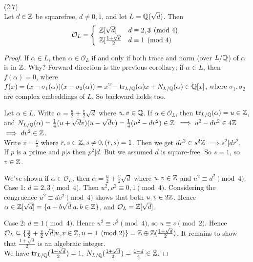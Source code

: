 \documentclass[a4paper]{article}
\begin{document}
\begin{prop} (2.7)\\
Let $d \in \mathbb{Z}$ be squarefree, $d \neq 0,1$, and let $L = \mathbb{Q}(\sqrt{d})$. Then 
\begin{equation*}
\begin{aligned}
\mathcal{O}_L = \left\{\begin{array}{ll}
\mathbb{Z}[\sqrt{d}] & d \equiv 2,3 \pmod 4\\
\mathbb{Z}[\frac{1+\sqrt{d}}{2} & d \equiv 1 \pmod 4
\end{array}
\right.
\end{aligned}
\end{equation*}
\begin{proof}
If $\alpha \in L$, then $\alpha \in \mathcal{O}_L$ if and only if both trace and norm (over $L/\mathbb{Q}$) of $\alpha$ is in $\mathbb{Z}$. Why? Forward direction is the previous corollary; if $\alpha \in L$, then $f(\alpha) = 0$, where $f(x) = (x-\sigma_1(\alpha))(x-\sigma_2(\alpha)) = x^2 - \operatorname{tr}_{L/\mathbb{Q}}(\alpha)x+N_{L/\mathbb{Q}}(\alpha) \in \mathbb{Q}[x]$, where $\sigma_1,\sigma_2$ are complex embeddings of $L$. So backward holds too.

Let $\alpha \in L$. Write $\alpha = \frac{u}{2} + \frac{v}{2}\sqrt{d}$ where $u,v \in \mathbb{Q}$. If $\alpha \in \mathcal{O}_L$, then $\operatorname{tr}_{L/\mathbb{Q}}(\alpha) = u \in \mathbb{Z}$, and $N_{L/\mathbb{Q}}(\alpha) = \frac{1}{4} (u+\sqrt{d} v) (u-\sqrt{d} v) = \frac{1}{4} (u^2-dv^2) \in \mathbb{Z}$ $\implies u^2-dv^2 \in 4\mathbb{Z}$ $\implies dv^2\in\mathbb{Z}$.\\
Write $v=\frac{r}{s}$ where $r,s \in \mathbb{Z}, s \neq 0, (r,s) = 1$. Then we get $dr^2 \in s^2\mathbb{Z}$ $\implies s^2 | dr^2$.\\
If $p$ is a prime and $p|s$ then $p^2|d$. But we assumed $d$ is square-free. So $s=1$, so $v \in \mathbb{Z}$.

We've shown if $\alpha \in \mathcal{O}_L$, then $\alpha = \frac{u}{2} + \frac{v}{2}\sqrt{d}$ where $u,v \in \mathbb{Z}$ and $u^2 \equiv d^2 \pmod 4$.\\

Case 1: $d \equiv 2,3 \pmod 4$. Then $u^2,v^2 \equiv 0,1 \pmod 4$. Considering the congruence $u^2\equiv dv^2 \pmod 4$ shows that both $u,v \in 2\mathbb{Z}$. Hence $\alpha \in \mathbb{Z}[\sqrt{d}] = \{a+b\sqrt{d} | a,b \in \mathbb{Z}\}$, and $\mathcal{O}_L = \mathbb{Z}[\sqrt{d}]$.

Case 2: $d \equiv 1 \pmod 4$. Hence $u^2\equiv v^2 \pmod 4$, so $u \equiv v \pmod 2$. Hence $\mathcal{O}_L \subseteq \{\frac{u}{2}+\frac{v}{2}\sqrt{d} | u,v \in \mathbb{Z}, u \equiv 1 \pmod 2\} =\mathbb{Z} \oplus \mathbb{Z}(\frac{1+\sqrt{d}}{2})$. It remains to show that $\frac{1+\sqrt{d}}{2}$ is an algebraic integer.\\
We have $\operatorname{tr}_{L/\mathbb{Q}}(\frac{1+\sqrt{d}}{2}) = 1$, $N_{L/\mathbb{Q}}(\frac{1+\sqrt{d}}{2}) = \frac{1-d}{4} \in \mathbb{Z}$.
\end{proof}
\end{prop}
\end{document}

